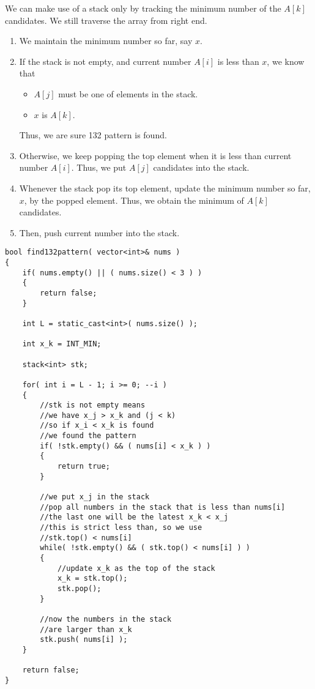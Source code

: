 We can make use of a stack only by tracking the minimum number of the $A[k]$ candidates. We still traverse the array from right end.
\begin{enumerate}
\item We maintain the minimum number so far, say $x$. 
\item If the stack is not empty, and current number $A[i]$ is less than $x$, we know that
\begin{itemize}
\item $A[j]$ must be one of elements in the stack.
\item $x$ is $A[k]$.
\end{itemize}
Thus, we are sure 132 pattern is found.
\item Otherwise, we keep popping the top element when it is less than current number $A[i]$. Thus, we put $A[j]$ candidates into the stack.
\item Whenever the stack pop its top element, update the minimum number so far, $x$, by the popped element. Thus, we obtain the minimum of $A[k]$ candidates.
\item Then, push current number into the stack.
\end{enumerate}
\begin{lstlisting}[style=customc, caption={Stack}]
bool find132pattern( vector<int>& nums )
{
    if( nums.empty() || ( nums.size() < 3 ) )
    {
        return false;
    }

    int L = static_cast<int>( nums.size() );

    int x_k = INT_MIN;

    stack<int> stk;

    for( int i = L - 1; i >= 0; --i )
    {
        //stk is not empty means
        //we have x_j > x_k and (j < k)
        //so if x_i < x_k is found
        //we found the pattern
        if( !stk.empty() && ( nums[i] < x_k ) )
        {
            return true;
        }

        //we put x_j in the stack
        //pop all numbers in the stack that is less than nums[i]
        //the last one will be the latest x_k < x_j
        //this is strict less than, so we use
        //stk.top() < nums[i]
        while( !stk.empty() && ( stk.top() < nums[i] ) )
        {
            //update x_k as the top of the stack
            x_k = stk.top();
            stk.pop();
        }

        //now the numbers in the stack
        //are larger than x_k
        stk.push( nums[i] );
    }

    return false;
}
\end{lstlisting}